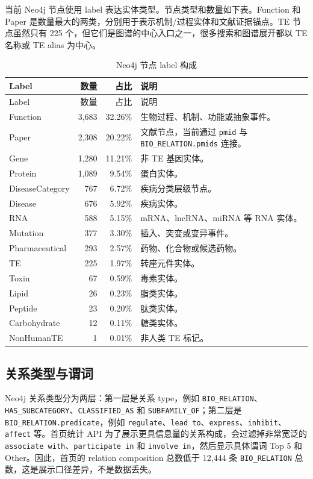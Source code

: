 \documentclass[12pt,a4paper,UTF8]{ctexart}
\newcommand{\code}[1]{\texttt{#1}}
\begin{document}
当前 Neo4j 节点使用 label 表达实体类型。节点类型和数量如下表。Function 和 Paper 是数量最大的两类，分别用于表示机制/过程实体和文献证据锚点。TE 节点虽然只有 225 个，但它们是图谱的中心入口之一，很多搜索和图谱展开都以 TE 名称或 TE alias 为中心。

\begin{longtable}{l r r p{}}
\caption{Neo4j 节点 label 构成}\\
\toprule
Label & 数量 & 占比 & 说明 \\
\midrule
\endfirsthead
\toprule
Label & 数量 & 占比 & 说明 \\
\midrule
\endhead
Function & 3,683 & 32.26\% & 生物过程、机制、功能或抽象事件。 \\
Paper & 2,308 & 20.22\% & 文献节点，当前通过 \code{pmid} 与 \code{BIO\_RELATION.pmids} 连接。 \\
Gene & 1,280 & 11.21\% & 非 TE 基因实体。 \\
Protein & 1,089 & 9.54\% & 蛋白实体。 \\
DiseaseCategory & 767 & 6.72\% & 疾病分类层级节点。 \\
Disease & 676 & 5.92\% & 疾病实体。 \\
RNA & 588 & 5.15\% & mRNA、lncRNA、miRNA 等 RNA 实体。 \\
Mutation & 377 & 3.30\% & 插入、突变或变异事件。 \\
Pharmaceutical & 293 & 2.57\% & 药物、化合物或候选药物。 \\
TE & 225 & 1.97\% & 转座元件实体。 \\
Toxin & 67 & 0.59\% & 毒素实体。 \\
Lipid & 26 & 0.23\% & 脂类实体。 \\
Peptide & 23 & 0.20\% & 肽类实体。 \\
Carbohydrate & 12 & 0.11\% & 糖类实体。 \\
NonHumanTE & 1 & 0.01\% & 非人类 TE 标记。 \\
\bottomrule
\end{longtable}

\subsection{关系类型与谓词}

Neo4j 关系类型分为两层：第一层是关系 type，例如 \code{BIO\_RELATION}、\code{HAS\_SUBCATEGORY}、\code{CLASSIFIED\_AS} 和 \code{SUBFAMILY\_OF}；第二层是 \code{BIO\_RELATION.predicate}，例如 \code{regulate}、\code{lead to}、\code{express}、\code{inhibit}、\code{affect} 等。首页统计 API 为了展示更具信息量的关系构成，会过滤掉非常宽泛的 \code{associate with}、\code{participate in} 和 \code{involve in}，然后显示具体谓词 Top 5 和 Other。因此，首页的 relation composition 总数低于 12,444 条 \code{BIO\_RELATION} 总数，这是展示口径差异，不是数据丢失。
\end{document}

